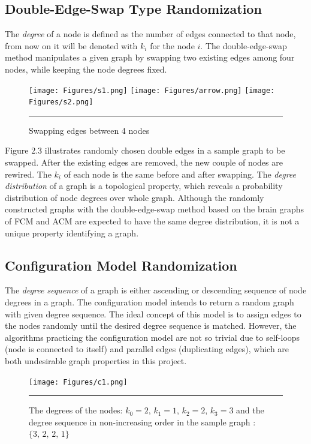 \subsection{Double-Edge-Swap Type Randomization}

The \textit{degree} of a node is defined as the number of edges connected to that node, from now on it will be denoted with $k_i$ for the node $i$. The double-edge-swap method manipulates a given graph by swapping two existing edges among four nodes, while keeping the node degrees fixed. 


\begin{figure}[htbp]
  \centering
	\texttt{[image: Figures/s1.png]}  
    \texttt{[image: Figures/arrow.png]}  
	\texttt{[image: Figures/s2.png]} 
    \rule{35em}{0.5pt}
  \caption[Double-Edge-Swap Example]{Swapping edges between 4 nodes}
  \label{fig:Double-Edge-Swap Example}
\end{figure}

Figure 2.3 illustrates randomly chosen double edges in a sample graph to be swapped. After the existing edges are removed, the new couple of nodes are rewired. The $k_i$ of each node is the same before and after swapping. The \textit{degree distribution} of a graph is a topological property, which reveals a probability distribution of node degrees over whole graph. Although the randomly constructed graphs with the double-edge-swap method based on the brain graphs of FCM and ACM are expected to have the same degree distribution, it is not a unique property identifying a graph.

\subsection{Configuration Model Randomization}

The \textit{degree sequence} of a graph is either ascending or descending sequence of node degrees in a graph. The configuration model intends to return a random graph with given degree sequence. The ideal concept of this model is to assign edges to the nodes randomly until the desired degree sequence is matched. However, the algorithms practicing the configuration model are not so trivial due to self-loops (node is connected to itself) and parallel edges (duplicating edges), which are both undesirable graph properties in this project. 

\begin{figure}[htbp]
  \centering
	\texttt{[image: Figures/c1.png]}  
    \rule{35em}{0.5pt}
    \caption[Degree Sequence Definition]{The degrees of the nodes: $k_0 = 2$, $k_1 =1$, $k_2=2$, $k_3=3$ and the degree sequence in non-increasing order in the sample graph : $\{3,\,2,\,2,\,1\}$}
  \label{fig:Degree Sequence Definition}
\end{figure}

